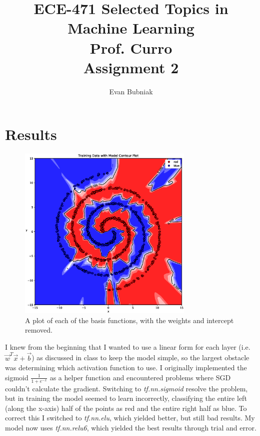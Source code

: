 \documentclass[12pt]{article}
\title{%
   ECE-471 Selected Topics in Machine Learning \\
   Prof. Curro \\
   Assignment 2}
\author{Evan Bubniak}
\begin{document}
\maketitle

\section{Results}

\begin{figure}[H]
   \centering
   \includegraphics[width=0.75\textwidth]{Contour.eps}
   \caption{A plot of each of the basis functions, with the weights and intercept removed.}
\end{figure}

I knew from the beginning that I wanted to use a linear form for each layer (i.e. $\vec{w}^{T} \vec{x} + \vec{b}$) as discussed in class to keep the model simple, so the largest obstacle was determining which activation function to use. I originally implemented the sigmoid $\frac{1}{1 + e^{-x}}$ as a helper function and encountered problems where SGD couldn't calculate the gradient. Switching to \textit{tf.nn.sigmoid} resolve the problem, but in training the model seemed to learn incorrectly, classifying the entire left (along the x-axis) half of the points as red and the entire right half as blue. To correct this I switched to \textit{tf.nn.elu}, which yielded better, but still bad results. My model now uses \textit{tf.nn.relu6}, which yielded the best results through trial and error.
\end{document}
